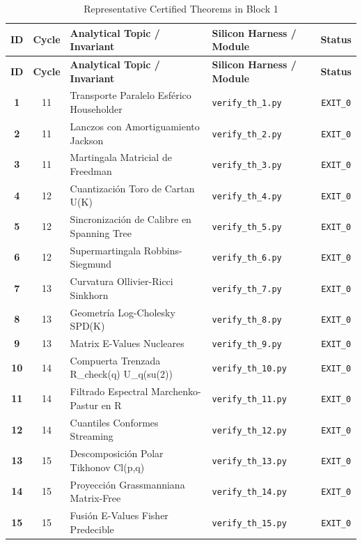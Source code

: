 \documentclass[journal,10pt,compsoc]{IEEEtran}
\theoremstyle{plain}
\theoremstyle{definition}
\begin{document}
\begin{center}
\small
\begin{longtable}{ccp{6.8cm}p{5.2cm}c}
\caption{Representative Certified Theorems in Block 1} \label{tab:theorems_block_1} \\
\toprule
\textbf{ID} & \textbf{Cycle} & \textbf{Analytical Topic / Invariant} & \textbf{Silicon Harness / Module} & \textbf{Status} \\
\midrule
\endfirsthead
\toprule
\textbf{ID} & \textbf{Cycle} & \textbf{Analytical Topic / Invariant} & \textbf{Silicon Harness / Module} & \textbf{Status} \\
\midrule
\endhead
\bottomrule
\endfoot
\textbf{1} & 11 & Transporte Paralelo Esférico Householder \label{thm:polydim_0001} & \texttt{verify\_th\_1.py} & \texttt{EXIT\_0} \\
\textbf{2} & 11 & Lanczos con Amortiguamiento Jackson \label{thm:polydim_0002} & \texttt{verify\_th\_2.py} & \texttt{EXIT\_0} \\
\textbf{3} & 11 & Martingala Matricial de Freedman \label{thm:polydim_0003} & \texttt{verify\_th\_3.py} & \texttt{EXIT\_0} \\
\textbf{4} & 12 & Cuantización Toro de Cartan U(K) \label{thm:polydim_0004} & \texttt{verify\_th\_4.py} & \texttt{EXIT\_0} \\
\textbf{5} & 12 & Sincronización de Calibre en Spanning Tree \label{thm:polydim_0005} & \texttt{verify\_th\_5.py} & \texttt{EXIT\_0} \\
\textbf{6} & 12 & Supermartingala Robbins-Siegmund \label{thm:polydim_0006} & \texttt{verify\_th\_6.py} & \texttt{EXIT\_0} \\
\textbf{7} & 13 & Curvatura Ollivier-Ricci Sinkhorn \label{thm:polydim_0007} & \texttt{verify\_th\_7.py} & \texttt{EXIT\_0} \\
\textbf{8} & 13 & Geometría Log-Cholesky SPD(K) \label{thm:polydim_0008} & \texttt{verify\_th\_8.py} & \texttt{EXIT\_0} \\
\textbf{9} & 13 & Matrix E-Values Nucleares \label{thm:polydim_0009} & \texttt{verify\_th\_9.py} & \texttt{EXIT\_0} \\
\textbf{10} & 14 & Compuerta Trenzada R\_check(q) U\_q(su(2)) \label{thm:polydim_0010} & \texttt{verify\_th\_10.py} & \texttt{EXIT\_0} \\
\textbf{11} & 14 & Filtrado Espectral Marchenko-Pastur en R \label{thm:polydim_0011} & \texttt{verify\_th\_11.py} & \texttt{EXIT\_0} \\
\textbf{12} & 14 & Cuantiles Conformes Streaming \label{thm:polydim_0012} & \texttt{verify\_th\_12.py} & \texttt{EXIT\_0} \\
\textbf{13} & 15 & Descomposición Polar Tikhonov Cl(p,q) \label{thm:polydim_0013} & \texttt{verify\_th\_13.py} & \texttt{EXIT\_0} \\
\textbf{14} & 15 & Proyección Grassmanniana Matrix-Free \label{thm:polydim_0014} & \texttt{verify\_th\_14.py} & \texttt{EXIT\_0} \\
\textbf{15} & 15 & Fusión E-Values Fisher Predecible \label{thm:polydim_0015} & \texttt{verify\_th\_15.py} & \texttt{EXIT\_0} \\
\bottomrule
\end{longtable}
\end{center}
\end{document}

